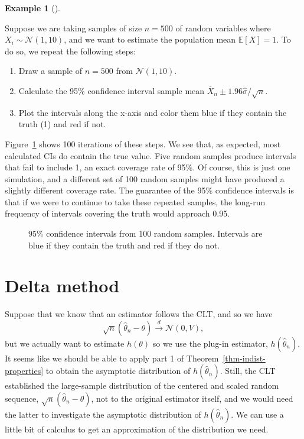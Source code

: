 \documentclass[
  13pt,
  letterpaper,
  DIV=11,
  numbers=noendperiod]{scrreprt}
\providecommand{\tightlist}{%
  \setlength{\itemsep}{0pt}\setlength{\parskip}{0pt}}\usepackage{longtable,booktabs,array}
\newcommand{\E}{\mathbb{E}}
\newcommand{\N}{\mathcal{N}}
\newcommand{\Xbar}{\overline{X}}
\newcommand{\indist}{\overset{d}{\to}}
\theoremstyle{definition}
\theoremstyle{definition}
\newtheorem{example}{Example}[chapter]
\theoremstyle{plain}
\theoremstyle{remark}
\begin{document}
\begin{example}[]\protect\hypertarget{exm-cis}{}\label{exm-cis}

Suppose we are taking samples of size \(n=500\) of random variables
where \(X_i \sim \N(1, 10)\), and we want to estimate the population
mean \(\E[X] = 1\). To do so, we repeat the following steps:

\begin{enumerate}
\def\labelenumi{\arabic{enumi}.}
\tightlist
\item
  Draw a sample of \(n=500\) from \(\N(1, 10)\).
\item
  Calculate the 95\% confidence interval sample mean
  \(\Xbar_n \pm 1.96\widehat{\sigma}/\sqrt{n}\).
\item
  Plot the intervals along the x-axis and color them blue if they
  contain the truth (1) and red if not.
\end{enumerate}

Figure~\ref{fig-ci-sim} shows 100 iterations of these steps. We see
that, as expected, most calculated CIs do contain the true value. Five
random samples produce intervals that fail to include 1, an exact
coverage rate of 95\%. Of course, this is just one simulation, and a
different set of 100 random samples might have produced a slightly
different coverage rate. The guarantee of the 95\% confidence intervals
is that if we were to continue to take these repeated samples, the
long-run frequency of intervals covering the truth would approach 0.95.

\begin{figure}[th]


\caption{\label{fig-ci-sim}95\% confidence intervals from 100 random
samples. Intervals are blue if they contain the truth and red if they do
not.}

\end{figure}%

\end{example}

\section{Delta method}\label{sec-delta-method}

Suppose that we know that an estimator follows the CLT, and so we have
\[
\sqrt{n}\left(\widehat{\theta}_n - \theta \right) \indist \N(0, V),
\] but we actually want to estimate \(h(\theta)\) so we use the plug-in
estimator, \(h(\widehat{\theta}_n)\). It seems like we should be able to
apply part 1 of Theorem~\ref{thm-indist-properties} to obtain the
asymptotic distribution of \(h(\widehat{\theta}_n)\). Still, the CLT
established the large-sample distribution of the centered and scaled
random sequence, \(\sqrt{n}(\widehat{\theta}_n - \theta)\), not to the
original estimator itself, and we would need the latter to investigate
the asymptotic distribution of \(h(\widehat{\theta}_n)\). We can use a
little bit of calculus to get an approximation of the distribution we
need.
\end{document}

